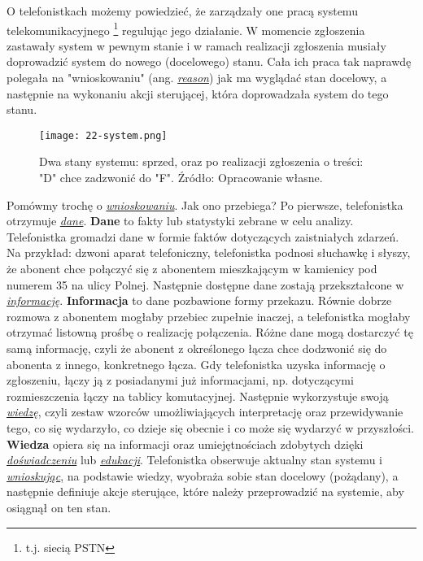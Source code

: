 O telefonistkach możemy powiedzieć, że zarządzały one pracą systemu telekomunikacyjnego \footnote{t.j. siecią PSTN} regulując jego działanie. W momencie zgłoszenia zastawały system w pewnym stanie i w ramach realizacji zgłoszenia musiały doprowadzić system do nowego (docelowego) stanu. Cała ich praca tak naprawdę polegała na "wnioskowaniu" (ang. \hyperlink{def:wnioskowanie}{\textit{reason}}) jak ma wyglądać stan docelowy, a następnie na wykonaniu akcji sterującej, która doprowadzała system do tego stanu. 

\begin{figure}[!htbp]
    \centering \texttt{[image: 22-system.png]}
    \caption{Dwa stany systemu: sprzed, oraz po realizacji zgłoszenia o treści: "D" chce zadzwonić do "F". Źródło: Opracowanie własne.}
\end{figure}

Pomówmy trochę o \hyperlink{def:wnioskowanie}{\textit{wnioskowaniu}}. Jak ono przebiega? Po pierwsze, telefonistka otrzymuje \hyperlink{def:dane}{\textit{dane}}. \textbf{Dane} to fakty lub statystyki zebrane w celu analizy. Telefonistka gromadzi dane w formie faktów dotyczących zaistniałych zdarzeń. Na przykład: dzwoni aparat telefoniczny, telefonistka podnosi słuchawkę i słyszy, że abonent chce połączyć się z abonentem mieszkającym w kamienicy pod numerem 35 na ulicy Polnej. Następnie dostępne dane zostają przekształcone w \hyperlink{def:informacja}{\textit{informację}}. \textbf{Informacja} to dane pozbawione formy przekazu. Równie dobrze rozmowa z abonentem mogłaby przebiec zupełnie inaczej, a telefonistka mogłaby otrzymać listowną prośbę o realizację połączenia. Różne dane mogą dostarczyć tę samą informację, czyli że abonent z określonego łącza chce dodzwonić się do abonenta z innego, konkretnego łącza. Gdy telefonistka uzyska informację o zgłoszeniu, łączy ją z posiadanymi już informacjami, np. dotyczącymi rozmieszczenia łączy na tablicy komutacyjnej. Następnie wykorzystuje swoją \hyperlink{def:wiedza}{\textit{wiedzę}}, czyli zestaw wzorców umożliwiających interpretację oraz przewidywanie tego, co się wydarzyło, co dzieje się obecnie i co może się wydarzyć w przyszłości. \textbf{Wiedza} opiera się na informacji oraz umiejętnościach zdobytych dzięki \hyperlink{def:doswiadczenie}{\textit{doświadczeniu}} lub \hyperlink{def:edukacja}{\textit{edukacji}}. Telefonistka obserwuje aktualny stan systemu i \hyperlink{def:wnioskowanie}{\textit{wnioskując}}, na podstawie wiedzy, wyobraża sobie stan docelowy (pożądany), a następnie definiuje akcje sterujące, które należy przeprowadzić na systemie, aby osiągnął on ten stan.


